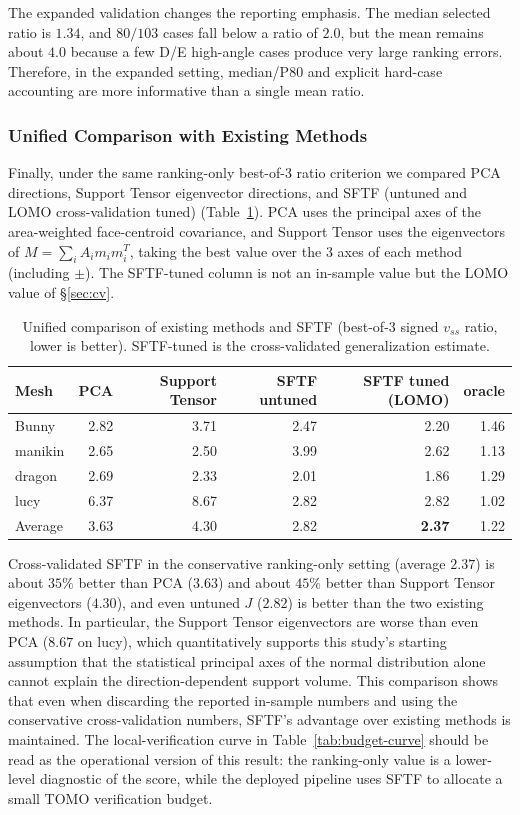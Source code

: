 \documentclass[11pt,a4paper]{article}
\begin{document}
The expanded validation changes the reporting emphasis.
The median selected ratio is $1.34$, and $80/103$ cases fall below a ratio of $2.0$, but the mean remains about $4.0$ because a few D/E high-angle cases produce very large ranking errors.
Therefore, in the expanded setting, median/P80 and explicit hard-case accounting are more informative than a single mean ratio.

\subsubsection{Unified Comparison with Existing Methods}
\label{sec:baseline}

Finally, under the same ranking-only best-of-3 ratio criterion we compared PCA directions, Support Tensor eigenvector directions,
and SFTF (untuned and LOMO cross-validation tuned) (Table~\ref{tab:unified}).
PCA
uses the principal axes of the area-weighted face-centroid covariance, and Support Tensor uses the eigenvectors of $M=\sum_i A_i m_i m_i^T$,
taking the best value over the 3 axes of each method (including $\pm$).
The SFTF-tuned column is not an in-sample value but the LOMO value of \S\ref{sec:cv}.

\begin{table}[H]
\centering
\caption{Unified comparison of existing methods and SFTF (best-of-3 signed $v_{ss}$ ratio, lower is better).
SFTF-tuned is the cross-validated generalization estimate.}
\label{tab:unified}
\begin{tabular}{lrrrrr}
\toprule
Mesh & PCA & Support Tensor & SFTF untuned & SFTF tuned (LOMO) & oracle\\
\midrule
Bunny    & 2.82 & 3.71 & 2.47 & 2.20 & 1.46\\
manikin  & 2.65 & 2.50 & 3.99 & 2.62 & 1.13\\
dragon   & 2.69 & 2.33 & 2.01 & 1.86 & 1.29\\
lucy     & 6.37 & 8.67 & 2.82 & 2.82 & 1.02\\
\midrule
Average     & 3.63 & 4.30 & 2.82 & \textbf{2.37} & 1.22\\
\bottomrule
\end{tabular}
\end{table}

Cross-validated SFTF in the conservative ranking-only setting (average $2.37$) is about $35\%$ better than PCA ($3.63$) and about $45\%$ better than Support Tensor eigenvectors ($4.30$),
and even untuned $J$ ($2.82$) is better than the two existing methods.
In particular, the Support Tensor eigenvectors are worse than even PCA ($8.67$ on lucy),
which quantitatively supports this study's starting assumption that the statistical principal axes of the normal distribution alone
cannot explain the direction-dependent support volume.
This comparison shows that even when discarding the reported in-sample numbers and using the conservative cross-validation numbers,
SFTF's advantage over existing methods is maintained.
The local-verification curve in Table~\ref{tab:budget-curve} should be read as the operational version of this result:
the ranking-only value is a lower-level diagnostic of the score, while the deployed pipeline uses SFTF to allocate a small TOMO verification budget.
\end{document}
